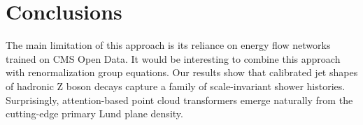 \section{Conclusions}\label{sec:conclusions}

The main limitation of this approach is its reliance on energy flow
networks trained on CMS Open Data. It would be interesting to combine
this approach with renormalization group equations. Our results show
that calibrated jet shapes of hadronic Z boson decays capture a family
of scale-invariant shower histories. Surprisingly, attention-based point
cloud transformers emerge naturally from the cutting-edge primary Lund
plane density.

